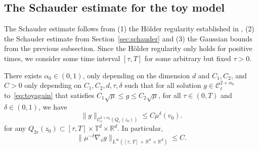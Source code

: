 \documentclass[10pt]{amsart}
\theoremstyle{definition}\newtheorem{defi}[theo]{Definition}\newtheorem{rema}[theo]{Remark}\newtheorem{exam}[theo]{Example}\newtheorem{exem}[theo]{Example}\newtheorem{nota}[theo]{Notation}
\newcommand{\R}{\mathbb{R}}
\newcommand{\T}{\mathbb{T}}
\newcommand{\cC}{\mathcal{C}}
\begin{document}
\subsection{The Schauder estimate for the toy model}\label{sec:scha-estim-toy}

The Schauder estimate follows from (1) the H\"older regularity established in \cite{gimv, wz09}, (2) the Schauder estimate from Section~\ref{sec:schauder} and (3) the Gaussian bounds from the previous subsection. Since the H\"older regularity only holds for positive times, we consider some time interval $[\tau,T]$ for some arbitrary but fixed $\tau>0$.

\begin{prop}\label{prop:local}
There exists ${\alpha_0} \in (0,1)$, only depending on the dimension $d$ and $C_1,C_2$, and $C>0$ only depending on $C_1,C_2,d, \tau,\delta$ such that for all solution $g \in \cC_\ell^{2+{\alpha_0}}$ to~\eqref{eq:toyagain} that satisfies $C_1 \sqrt \mu \le g \le C_2 \sqrt \mu$, for all $\tau \in (0,T)$ and $\delta \in (0,1)$, we have
\begin{equation}\label{eq:decay}
\| g \|_{\cC_\ell^{2+{\alpha_0}}\left(Q_r(z_0)\right)} \le C \mu^\delta (v_0).
\end{equation}
for any $Q_{2r} (z_0) \subset [\tau, T] \times \T^d \times \R^d$. In particular,
\begin{equation}\label{e:decay-grad}
\| \mu^{-\delta} \nabla_v g \|_{L^\infty\left([\tau,\,T] \,\times\,\R^d\,\times\,\R^d\right)} \le C.
\end{equation}
\end{prop}
\end{document}
